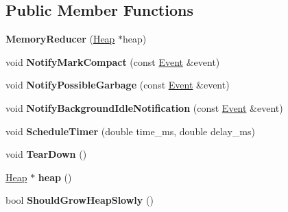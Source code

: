 \subsection*{Public Member Functions}
\begin{DoxyCompactItemize}
\item 
{\bfseries Memory\+Reducer} (\hyperlink{classv8_1_1internal_1_1_heap}{Heap} $\ast$heap)\hypertarget{classv8_1_1internal_1_1_memory_reducer_ac96b54dd8d2483419d8798146dc6e332}{}\label{classv8_1_1internal_1_1_memory_reducer_ac96b54dd8d2483419d8798146dc6e332}

\item 
void {\bfseries Notify\+Mark\+Compact} (const \hyperlink{structv8_1_1internal_1_1_memory_reducer_1_1_event}{Event} \&event)\hypertarget{classv8_1_1internal_1_1_memory_reducer_a1a5730063f4fecc950e8f86529e298d8}{}\label{classv8_1_1internal_1_1_memory_reducer_a1a5730063f4fecc950e8f86529e298d8}

\item 
void {\bfseries Notify\+Possible\+Garbage} (const \hyperlink{structv8_1_1internal_1_1_memory_reducer_1_1_event}{Event} \&event)\hypertarget{classv8_1_1internal_1_1_memory_reducer_a3c5d18afac0c49c61ef034a72d7efca5}{}\label{classv8_1_1internal_1_1_memory_reducer_a3c5d18afac0c49c61ef034a72d7efca5}

\item 
void {\bfseries Notify\+Background\+Idle\+Notification} (const \hyperlink{structv8_1_1internal_1_1_memory_reducer_1_1_event}{Event} \&event)\hypertarget{classv8_1_1internal_1_1_memory_reducer_a6e32ad630b941e4dc5e11e46ed987180}{}\label{classv8_1_1internal_1_1_memory_reducer_a6e32ad630b941e4dc5e11e46ed987180}

\item 
void {\bfseries Schedule\+Timer} (double time\+\_\+ms, double delay\+\_\+ms)\hypertarget{classv8_1_1internal_1_1_memory_reducer_a23d9e820268ac371ed037edcbd7c141c}{}\label{classv8_1_1internal_1_1_memory_reducer_a23d9e820268ac371ed037edcbd7c141c}

\item 
void {\bfseries Tear\+Down} ()\hypertarget{classv8_1_1internal_1_1_memory_reducer_a3010ec7bd3d474cac493524bcec6b19b}{}\label{classv8_1_1internal_1_1_memory_reducer_a3010ec7bd3d474cac493524bcec6b19b}

\item 
\hyperlink{classv8_1_1internal_1_1_heap}{Heap} $\ast$ {\bfseries heap} ()\hypertarget{classv8_1_1internal_1_1_memory_reducer_a6d461b494e05eb173fab49be31f4f485}{}\label{classv8_1_1internal_1_1_memory_reducer_a6d461b494e05eb173fab49be31f4f485}

\item 
bool {\bfseries Should\+Grow\+Heap\+Slowly} ()\hypertarget{classv8_1_1internal_1_1_memory_reducer_a892aacadda91617fc2d8420102258380}{}\label{classv8_1_1internal_1_1_memory_reducer_a892aacadda91617fc2d8420102258380}

\end{DoxyCompactItemize}
